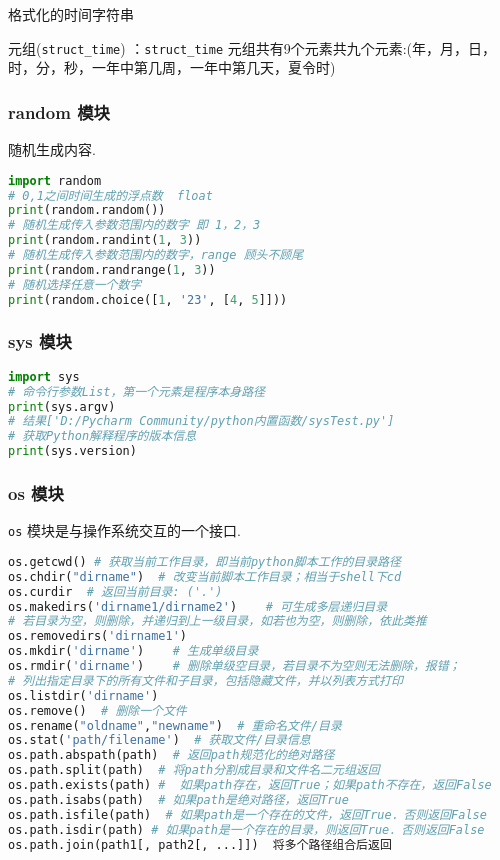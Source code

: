 格式化的时间字符串

元组(\verb|struct_time|)   ：\verb|struct_time| 元组共有9个元素共九个元素:(年，月，日，时，分，秒，一年中第几周，一年中第几天，夏令时)

\subsubsection{random 模块}
随机生成内容.
\begin{lstlisting}[language=python]
import random
# 0,1之间时间生成的浮点数  float
print(random.random())
# 随机生成传入参数范围内的数字 即 1，2，3
print(random.randint(1, 3))
# 随机生成传入参数范围内的数字，range 顾头不顾尾
print(random.randrange(1, 3))
# 随机选择任意一个数字
print(random.choice([1, '23', [4, 5]]))
\end{lstlisting}

\subsubsection{sys 模块}
\begin{lstlisting}[language=python]
import sys
# 命令行参数List，第一个元素是程序本身路径
print(sys.argv)
# 结果['D:/Pycharm Community/python内置函数/sysTest.py']
# 获取Python解释程序的版本信息
print(sys.version)
\end{lstlisting}

\subsubsection{os 模块}
\verb|os| 模块是与操作系统交互的一个接口.
\begin{lstlisting}[language=python]
os.getcwd() # 获取当前工作目录，即当前python脚本工作的目录路径
os.chdir("dirname")  # 改变当前脚本工作目录；相当于shell下cd
os.curdir  # 返回当前目录: ('.')
os.makedirs('dirname1/dirname2')    # 可生成多层递归目录
# 若目录为空，则删除，并递归到上一级目录，如若也为空，则删除，依此类推
os.removedirs('dirname1')
os.mkdir('dirname')    # 生成单级目录
os.rmdir('dirname')    # 删除单级空目录，若目录不为空则无法删除，报错；
# 列出指定目录下的所有文件和子目录，包括隐藏文件，并以列表方式打印
os.listdir('dirname')
os.remove()  # 删除一个文件
os.rename("oldname","newname")  # 重命名文件/目录
os.stat('path/filename')  # 获取文件/目录信息
os.path.abspath(path)  # 返回path规范化的绝对路径
os.path.split(path)  # 将path分割成目录和文件名二元组返回
os.path.exists(path) #  如果path存在，返回True；如果path不存在，返回False
os.path.isabs(path)  # 如果path是绝对路径，返回True
os.path.isfile(path)  # 如果path是一个存在的文件，返回True．否则返回False
os.path.isdir(path) # 如果path是一个存在的目录，则返回True．否则返回False
os.path.join(path1[, path2[, ...]])  将多个路径组合后返回
\end{lstlisting}
